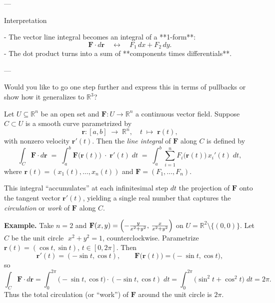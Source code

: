 \documentclass[11pt,openany]{article}
\renewcommand{\vec}[1]{\mathbf{#1}}
\begin{document}
---

 Interpretation

- The vector line integral becomes an integral of a **1-form**:  
\[
\vec{F} \cdot d\vec{r} \quad \leftrightarrow \quad F_1\,dx + F_2\,dy.
\]
- The dot product turns into a sum of **components times differentials**.

---

Would you like to go one step further and express this in terms of pullbacks or show how it generalizes to \( \mathbb{R}^3 \)?

\newpage
Let \(U\subseteq\mathbb{R}^n\) be an open set and 
\(\displaystyle\mathbf F:U\to\mathbb{R}^n\) a continuous vector field.  
Suppose \(C\subset U\) is a smooth curve parametrized by
\[
\mathbf r\colon [a,b]\;\longrightarrow\;\mathbb{R}^n,
\quad
t\;\mapsto\;\mathbf r(t),
\]
with nonzero velocity \(\mathbf r'(t)\).  Then the \emph{line integral} of \(\mathbf F\) along \(C\) is defined by
\[
\boxed{
	\int_C\mathbf F\!\cdot d\mathbf r
	\;=\;
	\int_a^b
	\mathbf F\bigl(\mathbf r(t)\bigr)\;\cdot\;\mathbf r'(t)\;dt
	\;=\;
	\int_a^b
	\sum_{i=1}^n F_i\bigl(\mathbf r(t)\bigr)\,x_i'(t)\;dt,
}
\]
where \(\mathbf r(t)=(x_1(t),\dots,x_n(t))\) and 
\(\mathbf F=(F_1,\dots,F_n)\).  

\medskip

\noindent
This integral “accumulates” at each infinitesimal step \(dt\) the projection of \(\mathbf F\) onto the tangent vector \(\mathbf r'(t)\), yielding a single real number that captures the \emph{circulation} or \emph{work} of \(\mathbf F\) along \(C\).

\bigskip

\noindent\textbf{Example.}  Take \(n=2\) and 
\(\displaystyle \mathbf F(x,y)
=\Bigl(-\tfrac{y}{x^2+y^2},\,\tfrac{x}{x^2+y^2}\Bigr)\)
on \(U=\mathbb{R}^2\setminus\{(0,0)\}\).  Let \(C\) be the unit circle 
\(\;x^2+y^2=1\), counterclockwise.  Parametrize
\(\mathbf r(t)=(\cos t,\sin t)\), \(t\in[0,2\pi]\).  Then
\[
\mathbf r'(t)=(-\sin t,\cos t),\qquad
\mathbf F\bigl(\mathbf r(t)\bigr)
=\bigl(-\sin t,\cos t\bigr),
\]
so
\[
\int_C\mathbf F\!\cdot d\mathbf r
=\int_0^{2\pi}
\bigl(-\sin t,\cos t\bigr)\cdot(-\sin t,\cos t)\;dt
=\int_0^{2\pi}
\bigl(\sin^2t+\cos^2t\bigr)\;dt
=2\pi.
\]
Thus the total circulation (or “work”) of \(\mathbf F\) around the unit circle is \(2\pi\).
\end{document}

